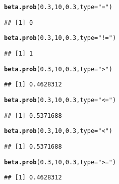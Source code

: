 \documentclass{article}\usepackage[]{graphicx}\usepackage[]{xcolor}
\makeatletter
\newcommand{\hlnum}[1]{\textcolor[rgb]{0.686,0.059,0.569}{#1}}%
\newcommand{\hlsng}[1]{\textcolor[rgb]{0.192,0.494,0.8}{#1}}%
\newcommand{\hldef}[1]{\textcolor[rgb]{0.345,0.345,0.345}{#1}}%
\newcommand{\hlkwc}[1]{\textcolor[rgb]{0.333,0.667,0.333}{#1}}%
\newcommand{\hlkwd}[1]{\textcolor[rgb]{0.737,0.353,0.396}{\textbf{#1}}}%
\newenvironment{kframe}{%
 \def\at@end@of@kframe{}%
 \ifinner\ifhmode%
  \def\at@end@of@kframe{\end{minipage}}%
  \begin{minipage}{\columnwidth}%
 \fi\fi%
 \def\FrameCommand##1{\hskip\@totalleftmargin \hskip-\fboxsep
 \colorbox{shadecolor}{##1}\hskip-\fboxsep
     \hskip-\linewidth \hskip-\@totalleftmargin \hskip\columnwidth}%
 \MakeFramed {\advance\hsize-\width
   \@totalleftmargin\z@ \linewidth\hsize
   \@setminipage}}%
 {\par\unskip\endMakeFramed%
 \at@end@of@kframe}
\newenvironment{knitrout}{}{} %
\makeatother
\begin{document}
\begin{enumerate}
\begin{knitrout}
\begin{kframe}
\begin{alltt}
\hlkwd{beta.prob}\hldef{(}\hlnum{0.3}\hldef{,} \hlnum{10}\hldef{,} \hlnum{0.3}\hldef{,} \hlkwc{type} \hldef{=} \hlsng{"="}\hldef{)}
\end{alltt}
\begin{verbatim}
## [1] 0
\end{verbatim}
\begin{alltt}
\hlkwd{beta.prob}\hldef{(}\hlnum{0.3}\hldef{,} \hlnum{10}\hldef{,} \hlnum{0.3}\hldef{,} \hlkwc{type} \hldef{=} \hlsng{"!="}\hldef{)}
\end{alltt}
\begin{verbatim}
## [1] 1
\end{verbatim}
\begin{alltt}
\hlkwd{beta.prob}\hldef{(}\hlnum{0.3}\hldef{,} \hlnum{10}\hldef{,} \hlnum{0.3}\hldef{,} \hlkwc{type} \hldef{=} \hlsng{">"}\hldef{)}
\end{alltt}
\begin{verbatim}
## [1] 0.4628312
\end{verbatim}
\begin{alltt}
\hlkwd{beta.prob}\hldef{(}\hlnum{0.3}\hldef{,} \hlnum{10}\hldef{,} \hlnum{0.3}\hldef{,} \hlkwc{type} \hldef{=} \hlsng{"<="}\hldef{)}
\end{alltt}
\begin{verbatim}
## [1] 0.5371688
\end{verbatim}
\begin{alltt}
\hlkwd{beta.prob}\hldef{(}\hlnum{0.3}\hldef{,} \hlnum{10}\hldef{,} \hlnum{0.3}\hldef{,} \hlkwc{type} \hldef{=} \hlsng{"<"}\hldef{)}
\end{alltt}
\begin{verbatim}
## [1] 0.5371688
\end{verbatim}
\begin{alltt}
\hlkwd{beta.prob}\hldef{(}\hlnum{0.3}\hldef{,} \hlnum{10}\hldef{,} \hlnum{0.3}\hldef{,} \hlkwc{type} \hldef{=} \hlsng{">="}\hldef{)}
\end{alltt}
\begin{verbatim}
## [1] 0.4628312
\end{verbatim}
\end{kframe}
\end{knitrout}
\end{enumerate}

\end{document}
